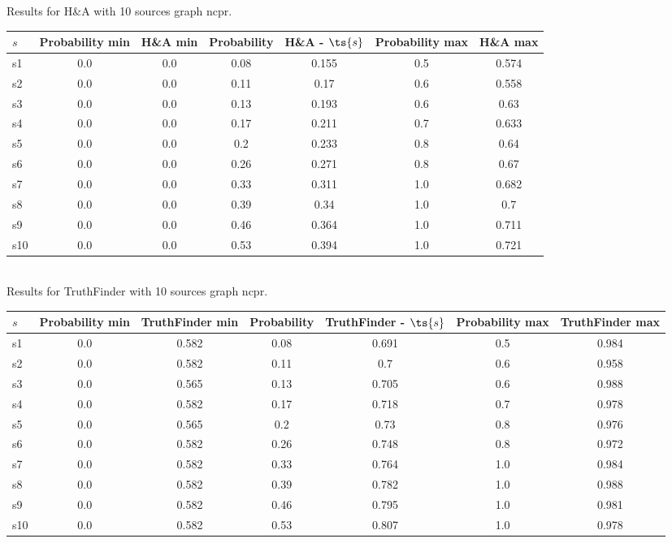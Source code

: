 \documentclass{article}
\begin{document}
\noindent Results for H\&A with 10 sources graph ncpr.

\noindent\begin{tabular}{|l|c|c|c|c|c|c|}
\hline
$s$& Probability min & H\&A min & Probability & H\&A - $\ts{s}$ & Probability max & H\&A max\\
\hline
s1 &0.0 & 0.0 & 0.08 & 0.155 & 0.5 & 0.574\\
\hline
s2 &0.0 & 0.0 & 0.11 & 0.17 & 0.6 & 0.558\\
\hline
s3 &0.0 & 0.0 & 0.13 & 0.193 & 0.6 & 0.63\\
\hline
s4 &0.0 & 0.0 & 0.17 & 0.211 & 0.7 & 0.633\\
\hline
s5 &0.0 & 0.0 & 0.2 & 0.233 & 0.8 & 0.64\\
\hline
s6 &0.0 & 0.0 & 0.26 & 0.271 & 0.8 & 0.67\\
\hline
s7 &0.0 & 0.0 & 0.33 & 0.311 & 1.0 & 0.682\\
\hline
s8 &0.0 & 0.0 & 0.39 & 0.34 & 1.0 & 0.7\\
\hline
s9 &0.0 & 0.0 & 0.46 & 0.364 & 1.0 & 0.711\\
\hline
s10 &0.0 & 0.0 & 0.53 & 0.394 & 1.0 & 0.721\\
\hline
\end{tabular}\\

\noindent Results for TruthFinder with 10 sources graph ncpr.

\noindent\begin{tabular}{|l|c|c|c|c|c|c|}
\hline
$s$& Probability min & TruthFinder min & Probability & TruthFinder - $\ts{s}$ & Probability max & TruthFinder max\\
\hline
s1 &0.0 & 0.582 & 0.08 & 0.691 & 0.5 & 0.984\\
\hline
s2 &0.0 & 0.582 & 0.11 & 0.7 & 0.6 & 0.958\\
\hline
s3 &0.0 & 0.565 & 0.13 & 0.705 & 0.6 & 0.988\\
\hline
s4 &0.0 & 0.582 & 0.17 & 0.718 & 0.7 & 0.978\\
\hline
s5 &0.0 & 0.565 & 0.2 & 0.73 & 0.8 & 0.976\\
\hline
s6 &0.0 & 0.582 & 0.26 & 0.748 & 0.8 & 0.972\\
\hline
s7 &0.0 & 0.582 & 0.33 & 0.764 & 1.0 & 0.984\\
\hline
s8 &0.0 & 0.582 & 0.39 & 0.782 & 1.0 & 0.988\\
\hline
s9 &0.0 & 0.582 & 0.46 & 0.795 & 1.0 & 0.981\\
\hline
s10 &0.0 & 0.582 & 0.53 & 0.807 & 1.0 & 0.978\\
\hline
\end{tabular}\\
\end{document}
